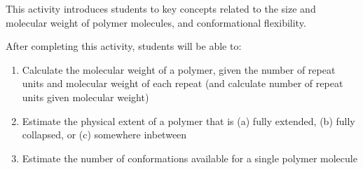 %
%
%
%

\renewcommand{\figpath}{content/intro/size-and-complexity/figs}
\renewcommand{\labelbase}{size-and-complexity}

\begin{activity}

\begin{instructornotes}

	This activity introduces students to key concepts related to the size and molecular weight of polymer molecules, and conformational flexibility.
	
	After completing this activity, students will be able to:
			\begin{enumerate}
				\item Calculate the molecular weight of a polymer, given the number of repeat units and molecular weight of each repeat (and calculate number of repeat units given molecular weight)
				\item Estimate the physical extent of a polymer that is (a) fully extended, (b) fully collapsed, or (c) somewhere inbetween
				\item Estimate the number of conformations available for a single polymer molecule
			\end{enumerate}
			

\end{instructornotes}
\end{activity}
